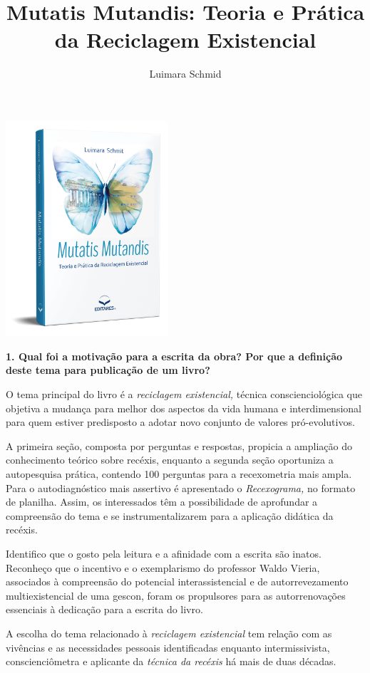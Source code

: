 \documentclass{gescons}
\author{Luimara Schmid}
\title{Mutatis Mutandis: Teoria e Prática da Reciclagem Existencial}
\begin{document}
    \makeentrevistatitle

    \begin{multicols}{2}

\begin{center}
    \includegraphics[width=6cm]{articles/entrevista/mockups/Luimara.png}
\end{center}

\textbf{1. Qual foi a motivação para a escrita da obra? Por que a definição deste tema para publicação de um livro?}


O tema principal do livro é a \emph{reciclagem existencial,} técnica conscienciológica que objetiva a mudança para melhor dos aspectos da vida humana e interdimensional para quem estiver predisposto a adotar novo conjunto de valores pró-evolutivos.

A primeira seção, composta por perguntas e respostas, propicia a ampliação do conhecimento teórico sobre recéxis, enquanto a segunda seção oportuniza a autopesquisa prática, contendo 100 perguntas para a recexometria mais ampla. Para o autodiagnóstico mais assertivo é apresentado o \emph{Recexograma,} no formato de planilha. Assim, os interessados têm a possibilidade de aprofundar a compreensão do tema e se instrumentalizarem para a aplicação didática da recéxis.

Identifico que o gosto pela leitura e a afinidade com a escrita são inatos. Reconheço que o incentivo e o exemplarismo do professor Waldo Vieria, associados à compreensão do potencial interassistencial e de autorrevezamento multiexistencial de uma gescon, foram os propulsores para as autorrenovações essenciais à dedicação para a escrita do livro.

A escolha do tema relacionado à \emph{reciclagem existencial} tem relação com as vivências e as necessidades pessoais identificadas enquanto intermissivista, conscienciômetra e aplicante da \emph{técnica da recéxis} há mais de duas décadas.


\end{multicols}
\end{document}
